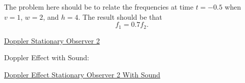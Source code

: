 \documentclass{ximera}
\begin{document}
The problem here should be to relate the frequencies at time $t=-0.5$ when $v=1$, $w=2$, and $h=4$. The result should be that 
\[
    f_1 = 0.7 f_2 . 
\]


\begin{onlineOnly}
    \begin{center}
\end{center}
\end{onlineOnly}

\href{https://www.desmos.com/calculator/celviaogz7}{Doppler Stationary Observer 2}

Doppler Effect with Sound:

\begin{onlineOnly}
    \begin{center}
\end{center}
\end{onlineOnly}

\href{https://www.desmos.com/calculator/gxzmjpgkrr}{Doppler Effect Stationary Observer 2 With Sound}
\end{document}
